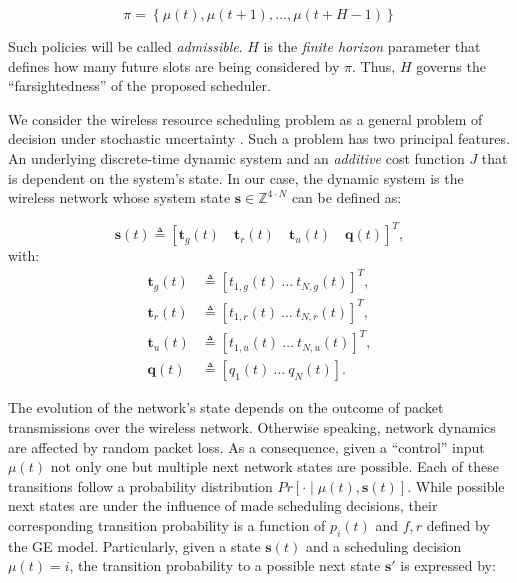 \begin{equation}
  \pi=\left\{ \mu(t), \mu(t+1), \dots, \mu(t+H-1) \right\}
\end{equation}

Such policies will be called \textit{admissible}. $H$ is the \textit{finite
horizon} parameter that defines how many future slots are being considered by
$\pi$. Thus, $H$ governs the ``farsightedness'' of the proposed scheduler.

We consider the wireless resource scheduling problem as a general problem of
decision under stochastic uncertainty \cite{bertsekas1995dynamic}. Such a
problem has two principal features. An underlying discrete-time dynamic system
and an \textit{additive} cost function $J$ that is dependent on the system's
state. In our case, the dynamic system is the wireless network whose system
state $\boldsymbol{s} \in \mathbb{Z}^{4\cdot N}$ can be defined as:

\begin{equation}
  \boldsymbol{s}(t) \triangleq \left[\boldsymbol{t}_g(t) \quad \boldsymbol{t}_r(t) \quad \boldsymbol{t}_u(t) \quad \boldsymbol{q}(t)\right]^T, 
\end{equation}   
with: 
\begin{align}
  \boldsymbol{t}_g(t) &\triangleq \left[ t_{1,g}(t) ~ \dots ~ t_{N,g}(t) \right]^T ,\\
  \boldsymbol{t}_r(t) &\triangleq \left[ t_{1,r}(t) ~ \dots ~ t_{N,r}(t) \right]^T ,\\
  \boldsymbol{t}_u(t) &\triangleq \left[ t_{1,u}(t) ~ \dots ~ t_{N,u}(t) \right]^T ,\\
  \boldsymbol{q}(t) &\triangleq \left[ q_1(t) ~ \dots ~ q_N(t) \right].
\end{align}  

The evolution of the network's state depends on the outcome of packet
transmissions over the wireless network. Otherwise speaking, network dynamics
are affected by random packet loss. As a consequence, given a ``control'' input
$\mu(t)$ not only one but multiple next network states are possible. Each of
these transitions follow a probability distribution $Pr\left[\cdot\mid\mu(t),
\boldsymbol{s}(t) \right]$. While possible next states are under the influence
of made scheduling decisions, their corresponding transition probability is a
function of $p_i(t)$ and $f,r$ defined by the GE model. Particularly, given a
state $\boldsymbol{s}(t)$ and a scheduling decision $\mu(t)=i$, the transition
probability to a possible next state $\boldsymbol{s'}$ is expressed by:

